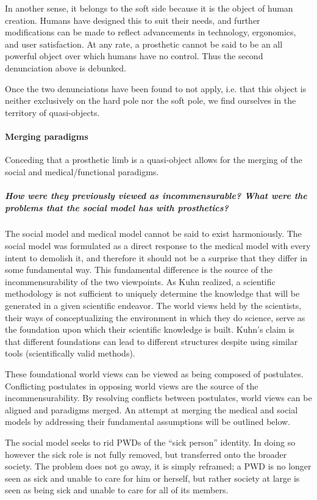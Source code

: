 \documentclass[a4paper]{article}
\begin{document}
In another sense, it belongs to the soft side because it is the object of
human creation. Humans have designed this to suit their needs, and further
modifications can be made to reflect advancements in technology, ergonomics,
and user satisfaction. At any rate, a prosthetic cannot be said to be an all
powerful object over which humans have no control. Thus the second
denunciation above is debunked.

Once the two denunciations have been found to not apply, i.e. that this object
is neither exclusively on the hard pole nor the soft pole, we find ourselves
in the territory of quasi-objects.


\paragraph{Merging paradigms}

Conceding that a prosthetic limb is a quasi-object allows for the merging of
the social and medical/functional paradigms.


\subparagraph{How were they previously viewed as incommensurable? What were
the problems that the social model has with prosthetics?}

The social model and medical model cannot be said to exist harmoniously. The
social model was formulated as a direct response to the medical model with
every intent to demolish it, and therefore it should not be a surprise that
they differ in some fundamental way. This fundamental difference is the source
of the incommensurability of the two viewpoints. As Kuhn realized, a
scientific methodology is not sufficient to uniquely determine the knowledge
that will be generated in a given scientific endeavor. The world views held by
the scientists, their ways of conceptualizing the environment in which they do
science, serve as the foundation upon which their scientific knowledge is
built. Kuhn's claim is that different foundations can lead to different
structures despite using similar tools (scientifically valid methods).

These foundational world views can be viewed as being composed of postulates.
Conflicting postulates in opposing world views are the source of the
incommensurability. By resolving conflicts between postulates, world views can
be aligned and paradigms merged. An attempt at merging the medical and social
models by addressing their fundamental assumptions will be outlined below.

The social model seeks to rid PWDs of the ``sick person'' identity. In doing
so however the sick role is not fully removed, but transferred onto the
broader society. The problem does not go away, it is simply reframed; a PWD is
no longer seen as sick and unable to care for him or herself, but rather
society at large is seen as being sick and unable to care for all of its
members.
\end{document}
